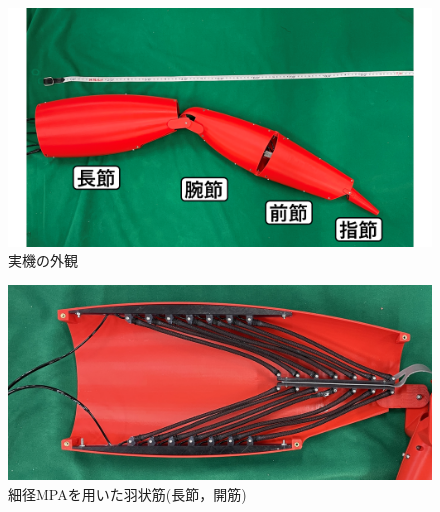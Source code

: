 \documentclass{jarticle}
\begin{document}

\begin{figure}[t]
  \centering
  \includegraphics[scale=0.15]{image/jikki.png}
  \vspace{-2mm}
  \caption{実機の外観}
  \label{fig:jikki}
\end{figure}


\begin{figure}[t!]
    \centering
    \includegraphics[scale=0.05]{image/crabmuscle.jpg}
    \vspace{-2mm}
    \caption{細径MPAを用いた羽状筋(長節，開筋)}
    \label{fig:muscle}
\end{figure}


\begin{table}[t]
  \centering
  \vspace{-2mm}
  \caption{実際の蟹と実機の可動域比較}
  \vspace{1mm}
  \label{tab:kadouiki}
\end{table}
\end{document}
